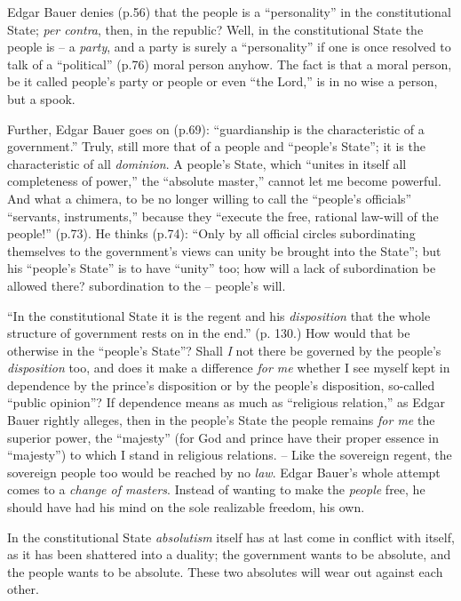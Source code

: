 \documentclass[12pt,a4paper]{book}
\begin{document}
Edgar Bauer denies (p.56) that the people is a ``personality'' in the 
constitutional State; \textit{per contra}, then, in the republic? Well, in the 
constitutional State the people is -- a \textit{party}, and a party is surely 
a ``personality'' if one is once resolved to talk of a ``political'' 
(p.76) moral person anyhow. The fact is that a moral person, be it called 
people's party or people or even ``the Lord,'' is in no wise a person, but a 
spook.

Further, Edgar Bauer goes on (p.69): ``guardianship is the characteristic of 
a government.'' Truly, still more that of a people and ``people's State''; 
it is the characteristic of all \textit{dominion}. A people's State, which 
``unites in itself all completeness of power,'' the ``absolute master,'' 
cannot let me become powerful. And what a chimera, to be no longer willing to 
call the ``people's officials'' ``servants, instruments,'' because they 
``execute the free, rational law-will of the people!'' (p.73). He thinks 
(p.74): ``Only by all official circles subordinating themselves to the 
government's views can unity be brought into the State''; but his ``people's 
State'' is to have ``unity'' too; how will a lack of subordination be 
allowed there? subordination to the -- people's will.

``In the constitutional State it is the regent and his \textit{disposition} 
that the whole structure of government rests on in the end.'' (p. 130.) How 
would that be otherwise in the ``people's State''? Shall \textit{I} not 
there be governed by the people's \textit{disposition} too, and does it make a 
difference \textit{for me} whether I see myself kept in dependence by the 
prince's disposition or by the people's disposition, so-called ``public 
opinion''? If dependence means as much as ``religious relation,'' as Edgar 
Bauer rightly alleges, then in the people's State the people remains 
\textit{for me} the superior power, the ``majesty'' (for God and prince have 
their proper essence in ``majesty'') to which I stand in religious 
relations. -- Like the sovereign regent, the sovereign people too would be 
reached by no \textit{law}. Edgar Bauer's whole attempt comes to a 
\textit{change of masters}. Instead of wanting to make the \textit{people} 
free, he should have had his mind on the sole realizable freedom, his own.

In the constitutional State \textit{absolutism} itself has at last come in 
conflict with itself, as it has been shattered into a duality; the government 
wants to be absolute, and the people wants to be absolute. These two absolutes 
will wear out against each other.
\end{document}
